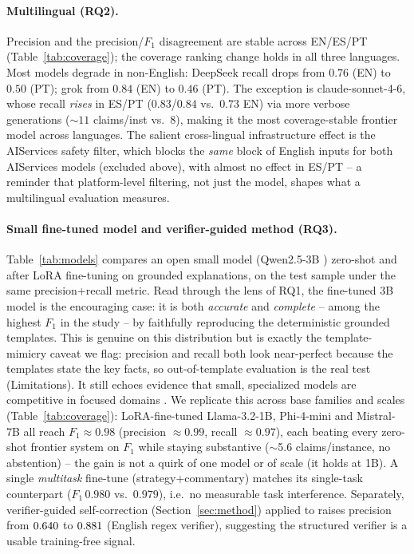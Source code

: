\documentclass[11pt]{article}
\begin{document}
\paragraph{Multilingual (RQ2).} Precision and the precision/$F_1$ disagreement are stable
across EN/ES/PT (Table~\ref{tab:coverage}); the coverage ranking change holds in all three
languages. Most models degrade in non-English: DeepSeek recall drops from $0.76$ (EN) to
$0.50$ (PT); grok from $0.84$ (EN) to $0.46$ (PT). The exception is claude-sonnet-4-6,
whose recall \emph{rises} in ES/PT ($0.83$/$0.84$ vs.\ $0.73$ EN) via more verbose
generations (${\sim}11$ claims/inst vs.\ $8$), making it the most coverage-stable frontier
model across languages. The salient cross-lingual infrastructure effect is the AIServices
safety filter, which blocks the \emph{same} block of English inputs for both AIServices
models (excluded above), with almost no effect in ES/PT -- a reminder that platform-level
filtering, not just the model, shapes what a multilingual evaluation measures.

\paragraph{Small fine-tuned model and verifier-guided method (RQ3).}
Table~\ref{tab:models} compares an open small model (Qwen2.5-3B
\citep{qwen2025}) zero-shot and after LoRA fine-tuning on grounded explanations, on the
test sample under the same precision+recall metric. Read through the lens of RQ1, the
fine-tuned 3B model is the encouraging case: it is both \emph{accurate} and
\emph{complete} -- among the highest $F_1$ in the study -- by faithfully reproducing the
deterministic grounded templates. This is genuine on this distribution but is exactly the
template-mimicry caveat we flag: precision and recall both look near-perfect because the
templates state the key facts, so out-of-template evaluation is the real test (Limitations).
It still echoes evidence that small, specialized models are competitive in focused domains
\citep{vectrayxnano2026}. We replicate this across base families and scales
(Table~\ref{tab:coverage}): LoRA-fine-tuned Llama-3.2-1B, Phi-4-mini and Mistral-7B all
reach $F_1 \approx 0.98$ (precision $\approx 0.99$, recall $\approx 0.97$), each beating
every zero-shot frontier system on $F_1$ while staying substantive ($\sim$5.6
claims/instance, no abstention) -- the gain is not a quirk of one model or of scale (it
holds at 1B). A single \emph{multitask} fine-tune (strategy+commentary) matches its
single-task counterpart ($F_1\,0.980$ vs.\ $0.979$), i.e.\ no measurable task interference.
Separately,
verifier-guided self-correction (Section~\ref{sec:method}) applied to \MethodModel{}
raises precision from $0.640{}$ to $0.881{}$ (English regex verifier),
suggesting the structured verifier is a usable training-free signal.
\end{document}
